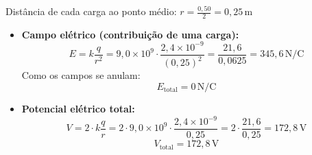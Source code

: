 \documentclass[a4paper,12pt]{article}
\begin{document}
\begin{flushleft}
\begin{enumerate}
    Distância de cada carga ao ponto médio: \( r = \frac{0{,}50}{2} = 0{,}25 \, \text{m} \)

    \begin{itemize}
        \item \textbf{Campo elétrico (contribuição de uma carga):}
        \begin{equation}
        E = k \frac{q}{r^2} = 9{,}0 \times 10^9 \cdot \frac{2{,}4 \times 10^{-9}}{(0{,}25)^2} 
        = \frac{21{,}6}{0{,}0625} = 345{,}6 \, \text{N/C}
        \end{equation}
        Como os campos se anulam:
        \begin{equation}
        \boxed{E_{\text{total}} = 0 \, \text{N/C}}
        \end{equation}
        
        \item \textbf{Potencial elétrico total:}
        \begin{equation}
        V = 2 \cdot k \frac{q}{r} = 2 \cdot 9{,}0 \times 10^9 \cdot \frac{2{,}4 \times 10^{-9}}{0{,}25}
        = 2 \cdot \frac{21{,}6}{0{,}25} = 172{,}8 \, \text{V}
        \end{equation}
        \begin{equation}
        \boxed{V_{\text{total}} = 172{,}8 \, \text{V}}
        \end{equation}
    \end{itemize}
\end{enumerate}
\end{flushleft}
\end{document}

